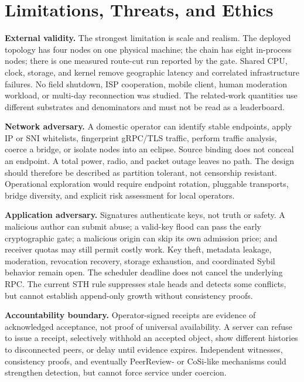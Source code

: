 \documentclass[sigconf,anonymous]{acmart}
\begin{document}
\section{Limitations, Threats, and Ethics}
\label{sec:limits}

\textbf{External validity.} The strongest limitation is scale and realism. The deployed topology has
four nodes on one physical machine; the chain has eight in-process nodes; there is one measured
route-cut run reported by the gate. Shared CPU, clock, storage, and kernel remove geographic latency
and correlated infrastructure failures. No field shutdown, ISP cooperation, mobile client, human
moderation workload, or multi-day reconnection was studied. The related-work quantities use different
substrates and denominators and must not be read as a leaderboard.

\textbf{Network adversary.} A domestic operator can identify stable endpoints, apply IP or SNI
whitelists, fingerprint gRPC/TLS traffic, perform traffic analysis, coerce a bridge, or isolate nodes
into an eclipse. Source binding does not conceal an endpoint. A total power, radio, and packet outage
leaves no path. The design should therefore be described as partition tolerant, not censorship
resistant. Operational exploration would require endpoint rotation, pluggable transports, bridge
diversity, and explicit risk assessment for local operators.

\textbf{Application adversary.} Signatures authenticate keys, not truth or safety. A malicious author
can submit abuse; a valid-key flood can pass the early cryptographic gate; a malicious origin can skip
its own admission price; and receiver quotas may still permit costly work. Key theft, metadata leakage,
moderation, revocation recovery, storage exhaustion, and coordinated Sybil behavior remain open.
The scheduler deadline does not cancel the underlying RPC. The current STH rule suppresses stale heads
and detects some conflicts, but cannot establish append-only growth without consistency proofs.

\textbf{Accountability boundary.} Operator-signed receipts are evidence of acknowledged acceptance,
not proof of universal availability. A server can refuse to issue a receipt, selectively withhold an
accepted object, show different histories to disconnected peers, or delay until evidence expires.
Independent witnesses, consistency proofs, and eventually PeerReview- or CoSi-like mechanisms could
strengthen detection, but cannot force service under coercion.
\end{document}
